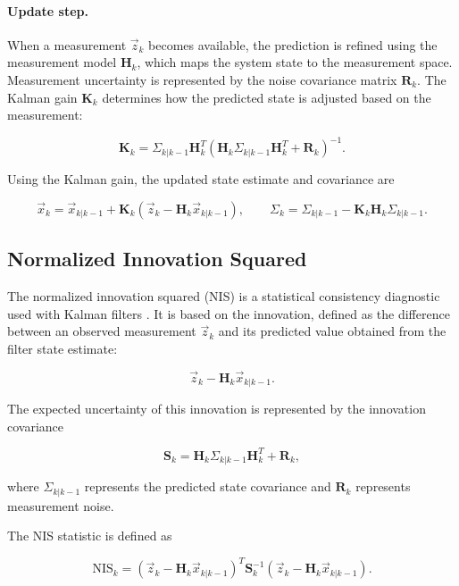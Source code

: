 \paragraph{Update step.}
When a measurement $\vec{z}_k$ becomes available, the prediction is refined using the measurement model $\mathbf{H}_k$, which maps the system state to the measurement space. Measurement uncertainty is represented by the noise covariance matrix $\mathbf{R}_k$. The Kalman gain $\mathbf{K}_k$ determines how the predicted state is adjusted based on the measurement:

\[
\mathbf{K}_k =
\Sigma_{k|k-1}\mathbf{H}_k^{T}
\left(\mathbf{H}_k\Sigma_{k|k-1}\mathbf{H}_k^{T} + \mathbf{R}_k\right)^{-1}.
\]

Using the Kalman gain, the updated state estimate and covariance are

\[
\vec{x}_k = \vec{x}_{k|k-1} + \mathbf{K}_k(\vec{z}_k - \mathbf{H}_k\vec{x}_{k|k-1}),
\qquad
\Sigma_k = \Sigma_{k|k-1} - \mathbf{K}_k\mathbf{H}_k\Sigma_{k|k-1}.
\]
\subsection{Normalized Innovation Squared}

The normalized innovation squared (NIS) is a statistical consistency diagnostic used with Kalman filters \cite{bar2001estimation,simon2006optimal}. It is based on the innovation, defined as the difference between an observed measurement $\vec{z}_k$ and its predicted value obtained from the filter state estimate:

\[
\vec{z}_k - \mathbf{H}_k\vec{x}_{k|k-1}.
\]

The expected uncertainty of this innovation is represented by the innovation covariance

\[
\mathbf{S}_k =
\mathbf{H}_k\Sigma_{k|k-1}\mathbf{H}_k^{T} + \mathbf{R}_k,
\]

where $\Sigma_{k|k-1}$ represents the predicted state covariance and $\mathbf{R}_k$ represents measurement noise.

The NIS statistic is defined as

\[
\mathrm{NIS}_k =
(\vec{z}_k - \mathbf{H}_k\vec{x}_{k|k-1})^{T}
\mathbf{S}_k^{-1}
(\vec{z}_k - \mathbf{H}_k\vec{x}_{k|k-1}).
\]